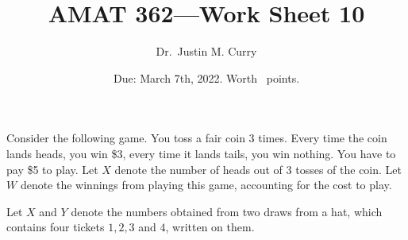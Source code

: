 \documentclass[addpoints,12pt]{exam}
\title{\vspace{-1in} AMAT 362---Work Sheet 10}
\date{Due: March 7th, 2022. Worth \numpoints\ points.}
\author{Dr.~Justin M. Curry}
\begin{document}
\maketitle


\begin{questions}

\question[3] Consider the following game. 
You toss a fair coin 3 times. Every time the coin lands heads, you win \$3, every time it lands tails, you win nothing. 
You have to pay \$5 to play. Let $X$ denote the number of heads out of 3 tosses of the coin. Let $W$ denote the winnings from playing this game, accounting for the cost to play.

\noaddpoints
{}
\addpoints

\question[6] Let $X$ and $Y$ denote the numbers obtained from two draws from a hat, which contains four tickets $1, 2, 3$ and $4$, written on them.

\noaddpoints
{}
\end{questions}
\end{document}
